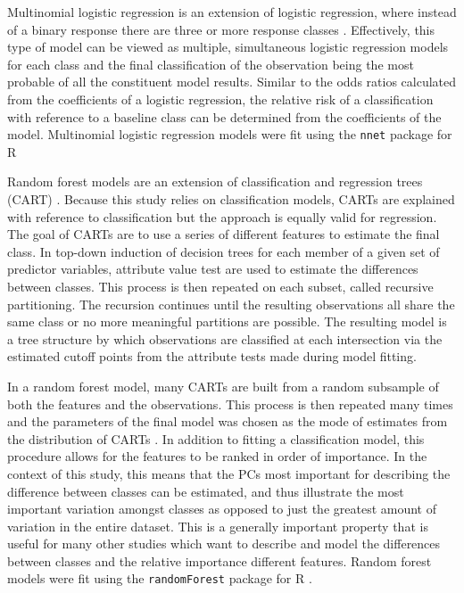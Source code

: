 \documentclass[12pt,letterpaper]{article}\usepackage{graphicx, color}
\begin{document}
Multinomial logistic regression is an extension of logistic regression, where instead of a binary response there are three or more response classes \citep{Venables2002a}. Effectively, this type of model can be viewed as multiple, simultaneous logistic regression models for each class and the final classification of the observation being the most probable of all the constituent model results. Similar to the odds ratios calculated from the coefficients of a logistic regression, the relative risk of a classification with reference to a baseline class can be determined from the coefficients of the model. Multinomial logistic regression models were fit using the \texttt{nnet} package for R \citep{Venables2002a}

Random forest models are an extension of classification and regression trees (CART) \citep{Breiman1984,Breiman2001}. Because this study relies on classification models, CARTs are explained with reference to classification but the approach is equally valid for regression. The goal of CARTs are to use a series of different features to estimate the final class. In top-down induction of decision trees for each member of a given set of predictor variables, attribute value test are used to estimate the differences between classes. This process is then repeated on each subset, called recursive partitioning. The recursion continues until the resulting observations all share the same class or no more meaningful partitions are possible. The resulting model is a tree structure by which observations are classified at each intersection via the estimated cutoff points from the attribute tests made during model fitting.

In a random forest model, many CARTs are built from a random subsample of both the features and the observations. This process is then repeated many times and the parameters of the final model was chosen as the mode of estimates from the distribution of CARTs \citep{Breiman2001}. In addition to fitting a classification model, this procedure allows for the features to be ranked in order of importance. In the context of this study, this means that the PCs most important for describing the difference between classes can be estimated, and thus illustrate the most important variation amongst classes as opposed to just the greatest amount of variation in the entire dataset. This is a generally important property that is useful for many other studies which want to describe and model the differences between classes and the relative importance different features. Random forest models were fit using the \texttt{randomForest} package for R \citep{Liaw2002}.
\end{document}
